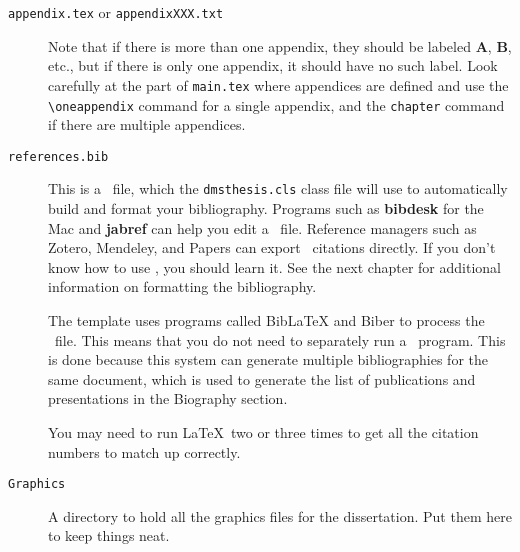 \begin{description}
\begin{description}
%
	\item[\texttt{appendix.tex} or \texttt{appendixXXX.txt}] Note that if there is more than one appendix, they should be labeled \textbf{A}, \textbf{B}, etc., but if there is only one appendix, it should have no such label. Look carefully at the part of \texttt{main.tex} where appendices are defined and use the \verb+\oneappendix+ command for a single appendix, and the \texttt{chapter} command if there are multiple appendices.
%
	\item[\texttt{references.bib}] This is a \BibTeX\ file, which the \texttt{dmsthesis.cls} class file will use to automatically build and format your bibliography. Programs such as \textbf{bibdesk} for the Mac and \textbf{jabref} can help you edit a \BibTeX\ file. Reference managers such as Zotero, Mendeley, and Papers can export \BibTeX\ citations directly. If you don't know how to use \BibTeX, you should learn it. See the next chapter for additional information on formatting the bibliography. 
	
	The template uses programs called BibLaTeX and Biber to process the \BibTeX\ file. This means that you do not need to separately run a \BibTeX\ program. This is done because this system can generate multiple bibliographies for the same document, which is used to generate the list of publications and presentations in the Biography section.
	
	You may need to run \LaTeX\ two or three times to get all the citation numbers to match up correctly.
%
	\item[\texttt{Graphics}] A directory to hold all the graphics files for the dissertation. Put them here to keep things neat.
  \end{description}
\end{description}



